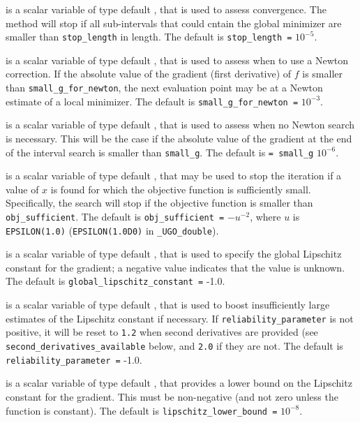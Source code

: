 \documentclass{galahad}
\newcommand{\packagename}{UGO}
\newcommand{\fullpackagename}{\libraryname\_\packagename}
\begin{document}
\begin{description}
 is a scalar variable of type default \realdp, that is used to
assess convergence. The method will stop if all sub-intervals that could
cntain the global minimizer are smaller than {\tt stop\_length} in length.
The default is {\tt stop\_length =} $10^{-5}$.

 is a scalar variable of type default \realdp,
that is used to assess when to use a Newton correction. If the absolute value
of the gradient (first derivative) of $f$ is smaller than
{\tt small\_g\_for\_newton}, the next evaluation point may be at a
Newton estimate of a local minimizer.
The default is {\tt small\_g\_for\_newton =} $10^{-3}$.

 is a scalar variable of type default \realdp, that is used to
assess when no Newton search is necessary. This will be the case if
the absolute value of the gradient at the end of the interval search is
smaller than {\tt small\_g}.
The default is {\tt = small\_g} $10^{-6}$.

 is a scalar variable of type default \realdp,
that may be used to stop the iteration if a value of $x$ is found for which
the objective function is sufficiently small. Specifically, the search
will stop if the objective function is smaller than {\tt obj\_sufficient}.
The default is {\tt obj\_sufficient =} $-u^{-2}$,
where $u$ is {\tt EPSILON(1.0)} ({\tt EPSILON(1.0D0)} in
{\tt \fullpackagename\_double}).

 is a scalar variable of type default \realdp,
that is used to specify the global Lipschitz constant for the gradient;
a negative value indicates that the value is unknown.
The default is {\tt global\_lipschitz\_constant =} -1.0.

 is a scalar variable of type default \realdp,
that is used to boost insufficiently large estimates of the Lipschitz constant
if necessary. If {\tt reliability\_parameter} is not positive, it will be
reset to {\tt 1.2} when second derivatives are provided
(see {\tt second\_derivatives\_available} below, and {\tt 2.0} if they
are not.
The default is {\tt reliability\_parameter =} -1.0.

 is a scalar variable of type default \realdp,
that provides a lower bound on the Lipschitz constant for the gradient.
This must be non-negative (and not zero unless the function is constant).
The default is {\tt lipschitz\_lower\_bound =} $10^{-8}$.


\end{description}
\end{document}
